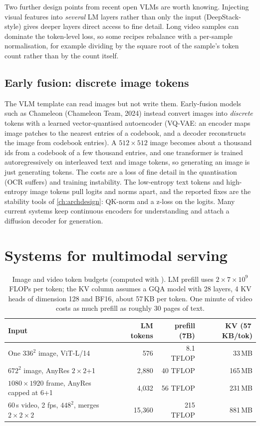 Two further design points from recent open VLMs are worth knowing. Injecting visual features
into \emph{several} LM layers rather than only the input (DeepStack-style) gives deeper layers
direct access to fine detail. Long video samples can dominate the token-level loss, so some
recipes rebalance with a per-sample normalisation, for example dividing by the square root of
the sample's token count rather than by the count itself.

\subsection{Early fusion: discrete image tokens}

The VLM template can read images but not write them. Early-fusion models such as Chameleon
(Chameleon Team, 2024) instead convert images into \emph{discrete} tokens with a learned
vector-quantised autoencoder (VQ-VAE: an encoder maps image patches to the nearest entries of a
codebook, and a decoder reconstructs the image from codebook entries). A $512\times512$ image
becomes about a thousand ids from a codebook of a few thousand entries, and one transformer is
trained autoregressively on interleaved text and image tokens, so generating an image is just
generating tokens. The costs are a loss of fine detail in the quantisation (OCR suffers) and
training instability. The low-entropy text tokens and high-entropy image tokens pull logits and norms
apart, and the reported fixes are the stability tools of \cref{ch:archdesign}: QK-norm and a
z-loss on the logits. Many current systems keep continuous encoders for understanding and attach
a diffusion decoder for generation.

\section{Systems for multimodal serving}\label{sec:align:mmsys}

\begin{table}[t]
\centering\small
\begin{tabular}{@{}lrrr@{}}
\toprule
\textbf{Input} & \textbf{LM tokens} & \textbf{prefill (7B)} & \textbf{KV (57\,KB/tok)}\\
\midrule
One $336^2$ image, ViT-L/14 & 576 & 8.1 TFLOP & 33\,MB\\
$672^2$ image, AnyRes $2\times2$+1 & 2{,}880 & 40 TFLOP & 165\,MB\\
$1080\times1920$ frame, AnyRes capped at 6+1 & 4{,}032 & 56 TFLOP & 231\,MB\\
60\,s video, 2 fps, $448^2$, merges $2\times2\times2$ & 15{,}360 & 215 TFLOP & 881\,MB\\
\bottomrule
\end{tabular}
\caption{Image and video token budgets (computed with ). LM prefill uses
$2\times7\times10^9$ FLOPs per token; the KV column assumes a GQA model with 28 layers, 4 KV heads of
dimension 128 and BF16, about 57\,KB per token. One minute of video costs as much prefill as
roughly 30 pages of text.}
\label{tab:align:mmtokens}
\end{table}

